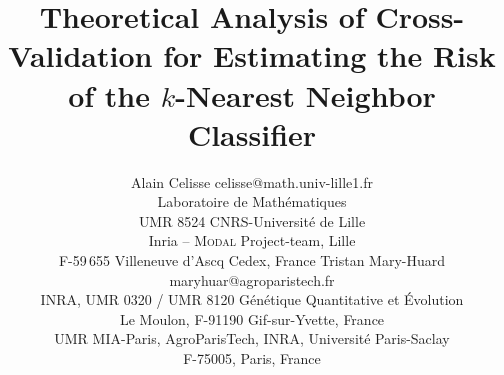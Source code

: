 \documentclass[twoside,11pt]{article}
\numberwithin{equation}{section}
\newcommand{\1}{\mathds{1}}%
\numberwithin{equation}{section}
\theoremstyle{plain}
\begin{document}
\title{Theoretical Analysis of Cross-Validation for Estimating the Risk of the $k$-Nearest Neighbor Classifier}


\author{\name Alain Celisse \email celisse@math.univ-lille1.fr\\
\addr Laboratoire de Math\'ematiques\\
UMR 8524 CNRS-Universit\'e de Lille\\
Inria -- \textsc{Modal}  Project-team, Lille \\
F-59\,655 Villeneuve d'Ascq Cedex, France
\AND
\name Tristan Mary-Huard \email maryhuar@agroparistech.fr\\
\addr INRA, UMR 0320 / UMR 8120 G\'en\'etique Quantitative et \'Evolution\\
Le Moulon, F-91190 Gif-sur-Yvette, France\\
UMR MIA-Paris, AgroParisTech, INRA, Universit\'e Paris-Saclay\\
F-75005, Paris, France}


\maketitle
\end{document}
